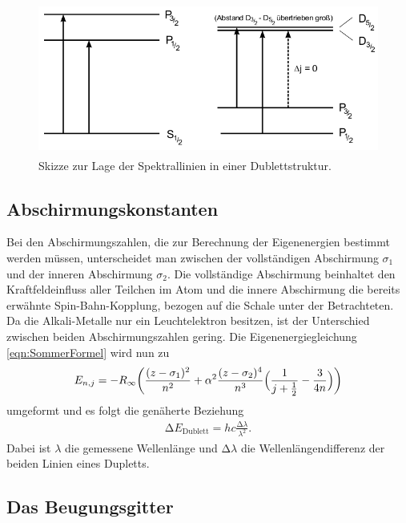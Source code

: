 \begin{figure}
  \centering
  \includegraphics[height=5cm]{MeinFotoalbum:)/Energieuebergaenge.png}
  \caption{Skizze zur Lage der Spektrallinien in einer Dublettstruktur.
  \cite{anleitung}}
  \label{fig:enueber}
\end{figure}

\subsection{Abschirmungskonstanten}

Bei den Abschirmungszahlen, die zur Berechnung der Eigenenergien bestimmt
werden müssen, unterscheidet man zwischen der vollständigen Abschirmung
$\sigma_1$ und der inneren Abschirmung $\sigma_2$. Die vollständige
Abschirmung beinhaltet den Kraftfeldeinfluss aller Teilchen im Atom und die
innere Abschirmung die bereits erwähnte Spin-Bahn-Kopplung, bezogen auf die
Schale unter der Betrachteten. Da die Alkali-Metalle nur ein Leuchtelektron
besitzen, ist der Unterschied zwischen beiden Abschirmungszahlen gering.
Die Eigenenergiegleichung \eqref{eqn:SommerFormel} wird nun zu
\begin{align}
  E_{n,j} = -R_\infty \biggl(\frac{(z-\sigma_1)^2}{n^2} +
  \alpha^2 \frac{(z-\sigma_2)^4}{n^3}
  \Bigl(\frac{1}{j+\frac{1}{2}} - \frac{3}{4n}\Bigr)\biggr)
\end{align}
umgeformt und es folgt die genäherte Beziehung
\begin{align}
  \increment E_\text{Dublett} = h c \frac{\increment \lambda}{\lambda^2}.
\end{align}
Dabei ist $\lambda$ die gemessene Wellenlänge und $\increment \lambda$ die
Wellenlängendifferenz der beiden Linien eines Dupletts.

\subsection{Das Beugungsgitter}

